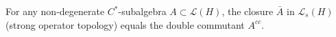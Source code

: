 For any non-degenerate $C^*$-subalgebra $A \subset \mathcal{L}(H)$, the closure $\bar{A}$ in $\mathcal{L}_s(H)$ (strong operator topology) equals the double commutant $A^{cc}$.
